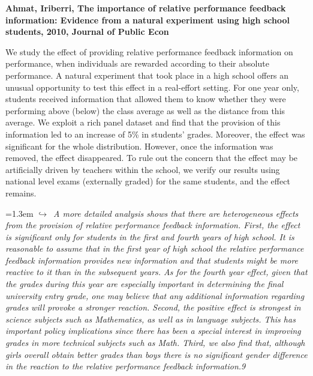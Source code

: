 \documentclass[11pt]{article}
\newcommand{\entry}[3]{%
  \par\medskip\noindent\textbf{#1}\par
  \nopagebreak #2\hspace{0.35em}{\small\color{tagcol}[#3]}\par}
\newcommand{\note}[1]{\par\smallskip\noindent\hangindent=1.3em
  \textcolor{notecol}{\footnotesize$\hookrightarrow$~\textit{#1}}}
\begin{document}
\entry{Ahmat, Iriberri, The importance of relative performance feedback information: Evidence from a natural experiment using high school students, 2010, Journal of Public Econ }{We study the effect of providing relative performance feedback information on performance, when individuals are rewarded according to their absolute performance. A natural experiment that took place in a high school offers an unusual opportunity to test this effect in a real-effort setting. For one year only, students received information that allowed them to know whether they were performing above (below) the class average as well as the distance from this average. We exploit a rich panel dataset and find that the provision of this information led to an increase of 5\% in students' grades. Moreover, the effect was significant for the whole distribution. However, once the information was removed, the effect disappeared. To rule out the concern that the effect may be artificially driven by teachers within the school, we verify our results using national level exams (externally graded) for the same students, and the effect remains.
}{rt}
\note{A more detailed analysis shows that there are heterogeneous effects from the provision of relative performance feedback information. First, the effect is significant only for students in the first and fourth years of high school. It is reasonable to assume that in the first year of high school the relative performance feedback information provides new information and that students might be more reactive to it than in the subsequent years. As for the fourth year effect, given that the grades during this year are especially important in determining the final university entry grade, one may believe that any additional information regarding grades will provoke a stronger reaction. Second, the positive effect is strongest in science subjects such as Mathematics, as well as in language subjects. This has important policy implications since there has been a special interest in improving grades in more technical subjects such as Math. Third, we also find that, although girls overall obtain better grades than boys there is no significant gender difference in the reaction to the relative performance feedback information.9
 }
\end{document}
